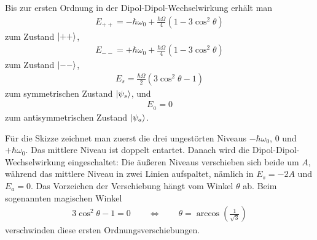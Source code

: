 \documentclass[11pt,a4paper]{scrartcl}
\begin{document}
\begin{enumerate}[label=(\alph*)]
\begin{calculationbox}
            \begin{calculationbox}[title=Zusammenfassung des gestörten Spektrums]
                Bis zur ersten Ordnung in der Dipol-Dipol-Wechselwirkung erhält man
                \begin{align*}
                    \boxed{
                    E_{++}
                    =
                    -\hbar\omega_0
                    +
                    \frac{\hbar\Omega}{4}(1-3\cos^2\theta)}
                \end{align*}
                zum Zustand $\ket{++}$,
                \begin{align*}
                    \boxed{
                    E_{--}
                    =
                    +\hbar\omega_0
                    +
                    \frac{\hbar\Omega}{4}(1-3\cos^2\theta)}
                \end{align*}
                zum Zustand $\ket{--}$,
                \begin{align*}
                    \boxed{
                    E_s
                    =
                    \frac{\hbar\Omega}{2}(3\cos^2\theta-1)}
                \end{align*}
                zum symmetrischen Zustand $\ket{\psi_s}$, und
                \begin{align*}
                    \boxed{
                    E_a
                    =
                    0}
                \end{align*}
                zum antisymmetrischen Zustand $\ket{\psi_a}$.
            \end{calculationbox}

            \begin{solutionbox}
                Für die Skizze zeichnet man zuerst die drei ungestörten Niveaus $-\hbar\omega_0$, $0$ und $+\hbar\omega_0$. Das mittlere Niveau ist doppelt entartet. Danach wird die Dipol-Dipol-Wechselwirkung eingeschaltet: Die äußeren Niveaus verschieben sich beide um $A$, während das mittlere Niveau in zwei Linien aufspaltet, nämlich in $E_s=-2A$ und $E_a=0$. Das Vorzeichen der Verschiebung hängt vom Winkel $\theta$ ab. Beim sogenannten magischen Winkel
                \begin{align*}
                    3\cos^2\theta-1=0
                    \qquad\Longleftrightarrow\qquad
                    \theta=\arccos\left(\frac{1}{\sqrt3}\right)
                \end{align*}
                verschwinden diese ersten Ordnungsverschiebungen.
            \end{solutionbox}
        \end{calculationbox}
    \end{enumerate}
\end{document}

